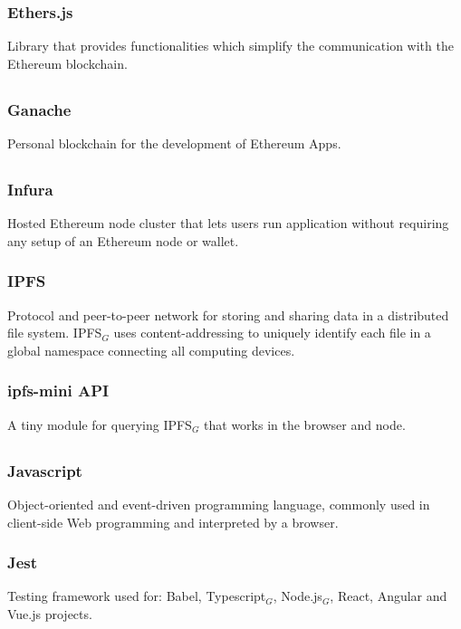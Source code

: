 		\subsubsection*{Ethers.js}
			Library that provides functionalities which simplify the communication with the Ethereum blockchain.
	
	\subsection*{}
		\subsubsection*{Ganache}
			Personal blockchain for the development of Ethereum \DJ{}Apps.
	
	\subsection*{}
		\subsubsection*{Infura}
			Hosted Ethereum node cluster that lets users run application without requiring any setup of an Ethereum node or wallet.
		\subsubsection*{IPFS}
			Protocol and peer-to-peer network for storing and sharing data in a distributed file system. IPFS$_{G}$ uses content-addressing to uniquely identify each file in a global namespace connecting all computing devices. 
		\subsubsection*{ipfs-mini API}
			A tiny module for querying IPFS$_{G}$ that works in the browser and node.
	
	\subsection*{}
		\subsubsection*{Javascript}
			Object-oriented and event-driven programming language, commonly used in client-side Web programming and interpreted by a browser.
		\subsubsection*{Jest}
			Testing framework used for: Babel, Typescript$_{G}$, Node.js$_{G}$, React, Angular and Vue.js projects.
